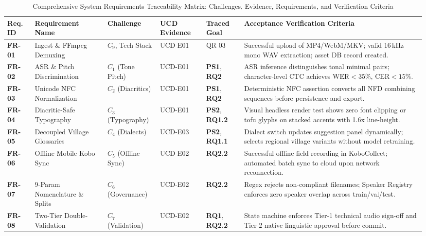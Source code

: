 \documentclass[conference]{IEEEtran}
\begin{document}
\begin{table}[t]
\centering
\scriptsize
\setlength{\tabcolsep}{3.5pt}
\caption{Comprehensive System Requirements Traceability Matrix: Challenges, Evidence, Requirements, and Verification Criteria}
\label{tab:requirements_traceability}
\begin{tabular}{p{1.2cm} p{3.2cm} p{1.6cm} p{1.5cm} p{1.8cm} >{\raggedright\arraybackslash}p{7.2cm}}
\toprule
\textbf{Req. ID} & \textbf{Requirement Name} & \textbf{Challenge} & \textbf{UCD Evidence} & \textbf{Traced Goal} & \textbf{Acceptance Verification Criteria} \\
\midrule
\textbf{FR-01} & Ingest \& FFmpeg Demuxing & $C_9$, Tech Stack & UCD-E01 & QR-03 & Successful upload of MP4/WebM/MKV; valid 16\,kHz mono WAV extraction; asset DB record created. \\
\addlinespace
\textbf{FR-02} & ASR \& Pitch Discrimination & $C_1$ (Tone Pitch) & UCD-E01 & \textbf{PS1}, \textbf{RQ2} & ASR inference distinguishes tonal minimal pairs; character-level CTC achieves $\text{WER} < 35\%$, $\text{CER} < 15\%$. \\
\addlinespace
\textbf{FR-03} & Unicode NFC Normalization & $C_2$ (Diacritics) & UCD-E01 & \textbf{PS1}, \textbf{RQ2} & Deterministic NFC assertion converts all NFD combining sequences before persistence and export. \\
\addlinespace
\textbf{FR-04} & Diacritic-Safe Typography & $C_3$ (Typography) & UCD-E01 & \textbf{PS2}, \textbf{RQ1.2} & Visual headless render test shows zero font clipping or tofu glyphs on stacked accents with 1.6x line-height. \\
\addlinespace
\textbf{FR-05} & Decoupled Village Glossaries & $C_4$ (Dialects) & UCD-E03 & \textbf{PS2}, \textbf{RQ1.1} & Dialect switch updates suggestion panel dynamically; selects regional village variants without model retraining. \\
\addlinespace
\textbf{FR-06} & Offline Mobile Kobo Sync & $C_5$ (Offline Sync) & UCD-E02 & \textbf{RQ2.2} & Successful offline field recording in KoboCollect; automated batch sync to cloud upon network reconnection. \\
\addlinespace
\textbf{FR-07} & 9-Param Nomenclature \& Splits & $C_6$ (Governance) & UCD-E02 & \textbf{RQ2.2} & Regex rejects non-compliant filenames; Speaker Registry enforces zero speaker overlap across train/val/test. \\
\addlinespace
\textbf{FR-08} & Two-Tier Double-Validation & $C_7$ (Validation) & UCD-E02 & \textbf{RQ1}, \textbf{RQ2.2} & State machine enforces Tier-1 technical audio sign-off and Tier-2 native linguistic approval before commit. \\

\end{tabular}
\end{table}
\end{document}
